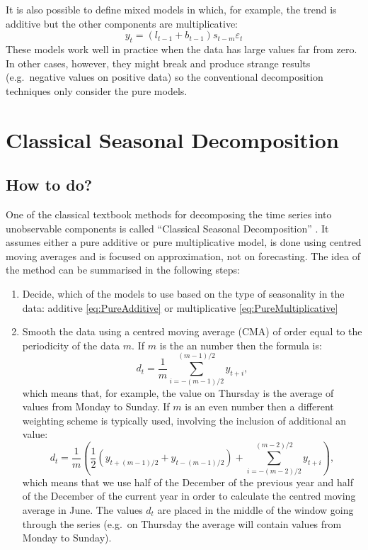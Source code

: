 \documentclass[
]{book}
\providecommand{\tightlist}{%
  \setlength{\itemsep}{0pt}\setlength{\parskip}{0pt}}
\theoremstyle{definition}
\theoremstyle{definition}
\theoremstyle{definition}
\theoremstyle{definition}
\theoremstyle{remark}
\begin{document}
It is also possible to define mixed models in which, for example, the trend is additive but the other components are multiplicative:
\begin{equation}
    y_t = (l_{t-1} + b_{t-1}) s_{t-m} \varepsilon_t
    \label{eq:MixedAdditiveTrend}
\end{equation}
These models work well in practice when the data has large values far from zero. In other cases, however, they might break and produce strange results (e.g.~negative values on positive data) so the conventional decomposition techniques only consider the pure models.

\hypertarget{ClassicalDecomposition}{%
\section{Classical Seasonal Decomposition}\label{ClassicalDecomposition}}

\hypertarget{how-to-do}{%
\subsection{How to do?}\label{how-to-do}}

One of the classical textbook methods for decomposing the time series into unobservable components is called ``Classical Seasonal Decomposition'' \citep{Persons1919}. It assumes either a pure additive or pure multiplicative model, is done using centred moving averages and is focused on approximation, not on forecasting. The idea of the method can be summarised in the following steps:

\begin{enumerate}
\def\labelenumi{\arabic{enumi}.}
\tightlist
\item
  Decide, which of the models to use based on the type of seasonality in the data: additive \eqref{eq:PureAdditive} or multiplicative \eqref{eq:PureMultiplicative}
\item
  Smooth the data using a centred moving average (CMA) of order equal to the periodicity of the data \(m\). If \(m\) is the an number then the formula is:
  \begin{equation}
   d_t = \frac{1}{m}\sum_{i=-(m-1)/2}^{(m-1)/2} y_{t+i},
   \label{eq:CMAOdd}
  \end{equation}
  which means that, for example, the value on Thursday is the average of values from Monday to Sunday. If \(m\) is an even number then a different weighting scheme is typically used, involving the inclusion of additional an value:
  \begin{equation}
   d_t = \frac{1}{m}\left(\frac{1}{2}\left(y_{t+(m-1)/2}+y_{t-(m-1)/2}\right) + \sum_{i=-(m-2)/2}^{(m-2)/2} y_{t+i}\right),
   \label{eq:CMAEven}
  \end{equation}
  which means that we use half of the December of the previous year and half of the December of the current year in order to calculate the centred moving average in June. The values \(d_t\) are placed in the middle of the window going through the series (e.g.~on Thursday the average will contain values from Monday to Sunday).
\end{enumerate}
\end{document}
